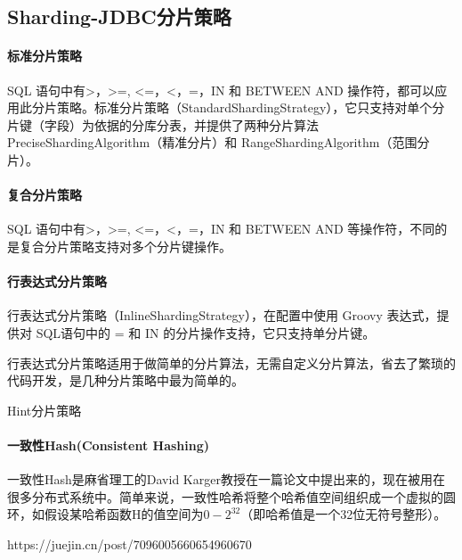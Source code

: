 \documentclass[../../../interview-questions.tex]{subfiles}
\begin{document}
\subsection{Sharding-JDBC分片策略}

\paragraph{标准分片策略}

SQL 语句中有>，>=, <=，<，=，IN 和 BETWEEN AND 操作符，都可以应用此分片策略。标准分片策略（StandardShardingStrategy），它只支持对单个分片键（字段）为依据的分库分表，并提供了两种分片算法 PreciseShardingAlgorithm（精准分片）和 RangeShardingAlgorithm（范围分片）。

\paragraph{复合分片策略}

SQL 语句中有>，>=, <=，<，=，IN 和 BETWEEN AND 等操作符，不同的是复合分片策略支持对多个分片键操作。

\paragraph{行表达式分片策略}

行表达式分片策略（InlineShardingStrategy），在配置中使用 Groovy 表达式，提供对 SQL语句中的 = 和 IN 的分片操作支持，它只支持单分片键。

行表达式分片策略适用于做简单的分片算法，无需自定义分片算法，省去了繁琐的代码开发，是几种分片策略中最为简单的。


Hint分片策略

\paragraph{一致性Hash(Consistent Hashing)}

一致性Hash是麻省理工的David Karger教授在一篇论文中提出来的，现在被用在很多分布式系统中。简单来说，一致性哈希将整个哈希值空间组织成一个虚拟的圆环，如假设某哈希函数H的值空间为$0-2^{32}$（即哈希值是一个32位无符号整形）。

https://juejin.cn/post/7096005660654960670
\end{document}
